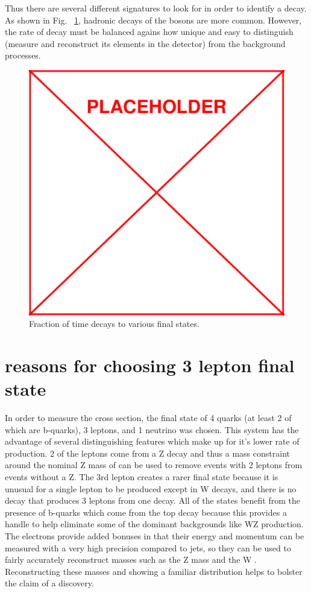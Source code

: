 	Thus there are several different signatures to look for in order to identify a \ttZ decay. As shown in Fig. ~\ref{fig:ttZ_decay_rates}, hadronic decays of the bosons are more common. However, the rate of decay must be balanced agains how unique and easy to distinguish (measure and reconstruct its elements in the detector) from the background processes.
	
	\begin{figure}[h]
\begin{center}
\includegraphics[width=0.48\linewidth]{Figs/placeholder.pdf}
\caption{\label{fig:ttZ_decay_rates}
Fraction of time \ttZ decays to various final states.
}
\end{center}
\end{figure} 

	
	\section{reasons for choosing 3 lepton final state}
	In order to measure the \ttZ cross section, the final state of 4 quarks (at least 2 of which are b-quarks), 3 leptons, and 1 neutrino was chosen. This system has the advantage of several distinguishing features which make up for it's lower rate of production. 2 of the leptons come from a Z decay and thus a mass constraint around the nominal Z mass of \zmass can be used to remove events with 2 leptons from events without a Z. The 3rd lepton creates a rarer final state because it is unusual for a single lepton to be produced except in W decays, and there is no decay that produces 3 leptons from one decay. All of the states benefit from the presence of b-quarks which come from the top decay because this provides a handle to help eliminate some of the dominant backgrounds like WZ production.\\
	
	The electrons provide added bonuses in that their energy and momentum can be measured with a very high precision compared to jets, so they can be used to fairly accurately reconstruct masses such as the Z mass and the W \mt. Reconstructing these masses and showing a familiar distribution helps to bolster the claim of a \ttZ discovery. 